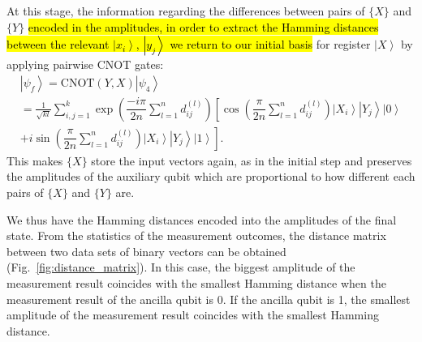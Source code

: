\documentclass[pra,showkeys,twocolumn,showpacs]{revtex4-1}
\begin{document}
At this stage, the information regarding the differences between pairs of $\{X\}$ and $\{Y\}$ \hl{encoded in the amplitudes, in order to extract the Hamming distances between the relevant $\left| x_i \right\rangle$, $\left| y_j \right\rangle$ we return to our initial basis} for register $\left| X \right\rangle$ by applying pairwise CNOT gates:
%
\begin{multline}
    \left| \psi_f \right\rangle = 
    \mathrm{CNOT} (Y,X)\left| \psi_4 \right\rangle \\=  
    \frac{1}{\sqrt{kl}}\sum\limits_{i, j=1}^{k} 
    \exp \left(\dfrac{-i \pi}{2n}\sum\limits_{l=1}^n d^{(l)}_{ij} \right)
				\left[ \cos\left(\dfrac{\pi}{2n}\sum\limits_{l=1}^n d^{(l)}_{ij} \right)
        \left| X_i \right\rangle 
        \left| Y_j \right\rangle 
        \left| 0 \right\rangle\right.
        \\+
        \left. i \sin\left(\dfrac{\pi}{2n}\sum\limits_{l=1}^n d^{(l)}_{ij} \right)
        \left| X_i \right\rangle 
        \left| Y_j \right\rangle 
        \left| 1 \right\rangle\right] .
\end{multline}
%
This makes $\{X\}$ store the input vectors again, as in the initial step 
and preserves the amplitudes of the auxiliary qubit which are proportional to how different each pairs of $\{X\}$ and $\{Y\}$ are.

We thus have the Hamming distances encoded into the amplitudes of the final state. 
From the statistics of the measurement outcomes, the distance matrix between two data sets of binary vectors can be obtained (Fig.~\ref{fig:distance_matrix}). 
In this case, the biggest amplitude of the measurement result coincides with the smallest Hamming distance when the measurement result of the ancilla qubit is 0. 
If the ancilla qubit is 1, the smallest amplitude of the measurement result coincides with the smallest Hamming distance.  
\end{document}
